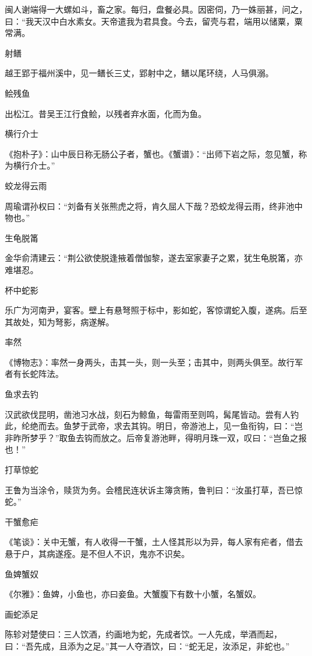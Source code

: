 \documentclass[a4paper,12pt,UTF8,twoside]{ctexbook}
\begin{document}
    闽人谢端得一大螺如斗，畜之家。每归，盘餐必具。因密伺，乃一姝丽甚，问之，曰：“我天汉中白水素女。天帝遣我为君具食。今去，留壳与君，端用以储粟，粟常满。
    
    射鳝
    
    越王郢于福州溪中，见一鳝长三丈，郢射中之，鳝以尾环绕，人马俱溺。
    
    鲙残鱼
    
    出松江。昔吴王江行食鲙，以残者弃水面，化而为鱼。
    
    横行介士
    
    《抱朴子》：山中辰日称无肠公子者，蟹也。《蟹谱》：“出师下岩之际，忽见蟹，称为横行介士。”
    
    蛟龙得云雨
    
    周瑜谓孙权曰：“刘备有关张熊虎之将，肯久屈人下哉？恐蛟龙得云雨，终非池中物也。”
    
    生龟脱筩
    
    金华俞清建云：“荆公欲使脱逢掖着僧伽黎，遂去室家妻子之累，犹生龟脱筩，亦难堪忍。
    
    杯中蛇影
    
    乐广为河南尹，宴客。壁上有悬弩照于标中，影如蛇，客惊谓蛇入腹，遂病。后至其故处，知为弩影，病遂解。
    
    率然
    
    《博物志》：率然一身两头，击其一头，则一头至；击其中，则两头俱至。故行军者有长蛇阵法。
    
    鱼求去钓
    
    汉武欲伐昆明，凿池习水战，刻石为鲸鱼，每雷雨至则鸣，髯尾皆动。尝有人钓此，纶绝而去。鱼梦于武帝，求去其钩。明日，帝游池上，见一鱼衔钩，曰：“岂非昨所梦乎？”取鱼去钩而放之。后帝复游池畔，得明月珠一双，叹曰：“岂鱼之报也！”
    
    打草惊蛇
    
    王鲁为当涂令，赎货为务。会稽民连状诉主簿贪贿，鲁判曰：“汝虽打草，吾已惊蛇。”
    
    干蟹愈疟
    
    《笔谈》：关中无蟹，有人收得一干蟹，土人怪其形以为异，每人家有疟者，借去悬于户，其病遂痊。是不但人不识，鬼亦不识矣。
    
    鱼婢蟹奴
    
    《尔雅》：鱼婢，小鱼也，亦曰妾鱼。大蟹腹下有数十小蟹，名蟹奴。
    
    画蛇添足
    
    陈轸对楚使曰：三人饮酒，约画地为蛇，先成者饮。一人先成，举酒而起，曰：“吾先成，且添为之足。”其一人夺酒饮，曰：“蛇无足，汝添足，非蛇也。”
    
\end{document}

